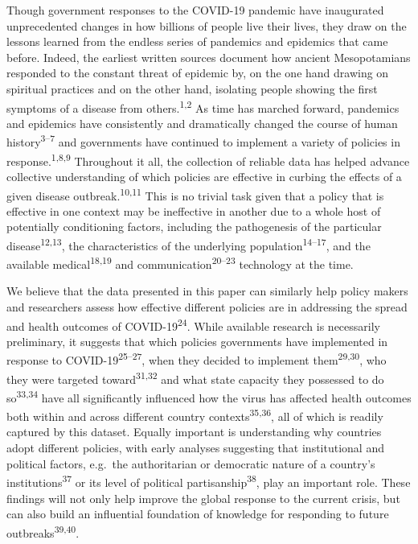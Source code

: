 \documentclass[]{article}
\begin{document}
Though government responses to the COVID-19 pandemic have inaugurated unprecedented changes in how billions of people live their lives, they draw on the lessons learned from the endless series of pandemics and epidemics that came before. Indeed, the earliest written sources document how ancient Mesopotamians responded to the constant threat of epidemic by, on the one hand drawing on spiritual practices and on the other hand, isolating people showing the first symptoms of a disease from others.\textsuperscript{1,2} As time has marched forward, pandemics and epidemics have consistently and dramatically changed the course of human history\textsuperscript{3--7} and governments have continued to implement a variety of policies in response.\textsuperscript{1,8,9} Throughout it all, the collection of reliable data has helped advance collective understanding of which policies are effective in curbing the effects of a given disease outbreak.\textsuperscript{10,11} This is no trivial task given that a policy that is effective in one context may be ineffective in another due to a whole host of potentially conditioning factors, including the pathogenesis of the particular disease\textsuperscript{12,13}, the characteristics of the underlying population\textsuperscript{14--17}, and the available medical\textsuperscript{18,19} and communication\textsuperscript{20--23} technology at the time.

We believe that the data presented in this paper can similarly help policy makers and researchers assess how effective different policies are in addressing the spread and health outcomes of COVID-19\textsuperscript{24}. While available research is necessarily preliminary, it suggests that which policies governments have implemented in response to COVID-19\textsuperscript{25--27}, when they decided to implement them\textsuperscript{29,30}, who they were targeted toward\textsuperscript{31,32} and what state capacity they possessed to do so\textsuperscript{33,34} have all significantly influenced how the virus has affected health outcomes both within and across different country contexts\textsuperscript{35,36}, all of which is readily captured by this dataset. Equally important is understanding why countries adopt different policies, with early analyses suggesting that institutional and political factors, e.g.~the authoritarian or democratic nature of a country's institutions\textsuperscript{37} or its level of political partisanship\textsuperscript{38}, play an important role. These findings will not only help improve the global response to the current crisis, but can also build an influential foundation of knowledge for responding to future outbreaks\textsuperscript{39,40}.
\end{document}
